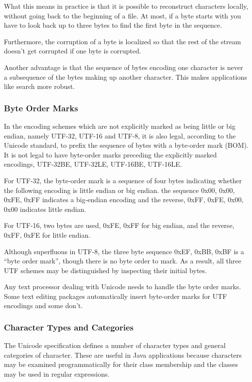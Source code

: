 What this means in practice is that it is possible to reconstruct
characters locally, without going back to the beginning of a file.
At most, if a byte starts with  you have to look back
up to three bytes to find the first byte in the sequence.

Furthermore, the corruption of a byte is localized so that the rest of
the stream doesn't get corrupted if one byte is corrupted.

Another advantage is that the sequence of bytes encoding one character
is never a subsequence of the bytes making up another character.  This
makes applications like search more robust.


\subsubsection{Byte Order Marks}\label{section:byte-order-marks}

In the encoding schemes which are not explicitly marked as being
little or big endian, namely UTF-32, UTF-16 and UTF-8, it is also
legal, according to the Unicode standard, to prefix the sequence of
bytes with a byte-order mark (BOM).  It is not legal to have
byte-order marks preceding the explicitly marked encodings, UTF-32BE,
UTF-32LE, UTF-16BE, UTF-16LE.

For UTF-32, the byte-order mark is a sequence of four bytes indicating
whether the following encoding is little endian or big endian.  the
sequence 0x00, 0x00, 0xFE, 0xFF indicates a big-endian encoding and
the reverse, 0xFF, 0xFE, 0x00, 0x00 indicates little endian.

For UTF-16, two bytes are used, 0xFE, 0xFF for big endian, and the
reverse, 0xFF, 0xFE for little endian.

Although superfluous in UTF-8, the three byte sequence 0xEF, 0xBB,
0xBF is a ``byte order mark'', though there is no byte order to mark.  
As a result, all three UTF schemes may be distinguished by inspecting
their initial bytes.

Any text processor dealing with Unicode needs to handle the byte order
marks.  Some text editing packages automatically insert byte-order
marks for UTF encodings and some don't.

\subsubsection{Character Types and Categories}\label{section:unicode-categories}

The Unicode specification defines a number of character types and
general categories of character.  These are useful in Java
applications because characters may be examined programmatically for
their class membership and the classes may be used in regular
expressions.

